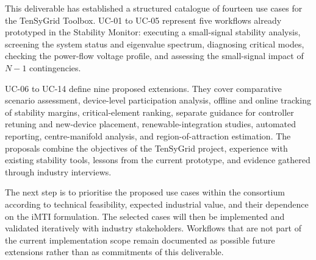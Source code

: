 This deliverable has established a structured catalogue of fourteen use cases for the TenSyGrid Toolbox. UC-01 to UC-05 represent five workflows already prototyped in the Stability Monitor: executing a small-signal stability analysis, screening the system status and eigenvalue spectrum, diagnosing critical modes, checking the power-flow voltage profile, and assessing the small-signal impact of $N-1$ contingencies.

UC-06 to UC-14 define nine proposed extensions. They cover comparative scenario assessment, device-level participation analysis, offline and online tracking of stability margins, critical-element ranking, separate guidance for controller retuning and new-device placement, renewable-integration studies, automated reporting, centre-manifold analysis, and region-of-attraction estimation. The proposals combine the objectives of the TenSyGrid project, experience with existing stability tools, lessons from the current prototype, and evidence gathered through industry interviews.

The next step is to prioritise the proposed use cases within the consortium according to technical feasibility, expected industrial value, and their dependence on the iMTI formulation. The selected cases will then be implemented and validated iteratively with industry stakeholders. Workflows that are not part of the current implementation scope remain documented as possible future extensions rather than as commitments of this deliverable.
